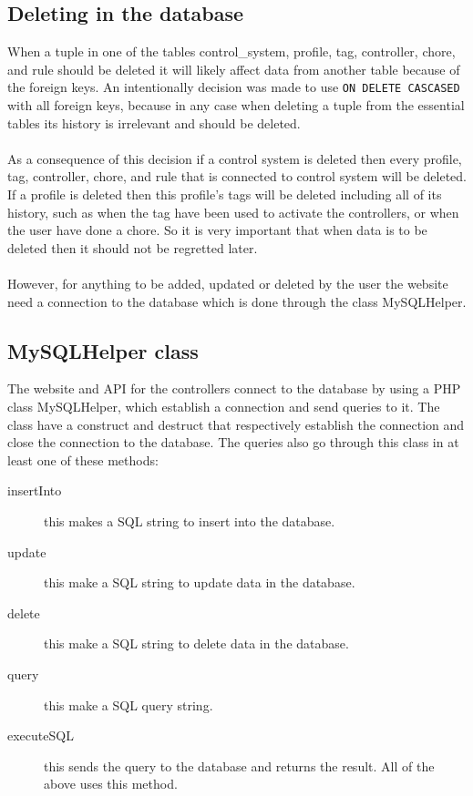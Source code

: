 \subsection{Deleting in the database}
When a tuple in one of the tables control\_system, profile, tag, controller, chore, and rule should be deleted it will likely affect data from another table because of the foreign keys. An intentionally decision was made to use \texttt{ON DELETE CASCASED} with all foreign keys, because in any case when deleting a tuple from the essential tables its history is irrelevant and should be deleted.\\
\\
As a consequence of this decision if a control system is deleted then every profile, tag, controller, chore, and rule that is connected to control system will be deleted. If a profile is deleted then this profile's tags will be deleted including all of its history, such as when the tag have been used to activate the controllers, or when the user have done a chore.
 So it is very important that when data is to be deleted then it should not be regretted later.  \\\\

However, for anything to be added, updated or deleted by the user the website need a connection to the database which is done through the class MySQLHelper. 

\subsection{MySQLHelper class}
The website and API for the controllers connect to the database by using a PHP class MySQLHelper, which establish a connection and send queries to it. The class have a construct and destruct that respectively establish the connection and close the connection to the database. The queries also go through this class in at least one of these methods:

\begin{description}
	\item[insertInto] this makes a SQL string to insert into the database.
	\item[update] this make a SQL string to update data in the database.	
	\item[delete] this make a SQL string to delete data in the database.
	\item[query] this make a SQL query string.
	\item[executeSQL] this sends the query to the database and returns the result. All of the above uses this method.
\end{description}
  
